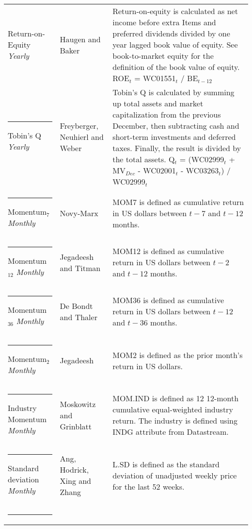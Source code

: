 \documentclass[12pt]{article}
\begin{document}
{{\begin{xltabular}{\textwidth}{ >{\raggedright\arraybackslash}p{0.23\textwidth} >{\raggedright\arraybackslash}p{0.2\textwidth} X}
Return-on-Equity \newline \emph{Yearly}		& Haugen and Baker \citeyearpar{HAUGEN1996}		& Return-on-equity is calculated as net income before extra Items and preferred dividends divided by one year lagged book value of equity. See book-to-market equity for the definition of the book value of equity. \newline ROE$_t$ = WC01551$_{t}$ / BE$_{t-12}$ \\ \rule{-1ex}{3ex}
Tobin's Q 	\newline \emph{Yearly}			& Freyberger, Neuhierl and Weber \citeyearpar{Freyberger2020} & Tobin's Q is calculated by summing up total assets and market capitalization from the previous December, then subtracting cash and short-term investments and deferred taxes. Finally, the result is divided by the total assets. \newline Q$_t$ = (WC02999$_{t}$ + MV$_{Dec}$ - WC02001$_{t}$ - WC03263$_{t}$) / WC02999$_{t}$ \\ \rule{-1ex}{3ex}
Momentum$_{7}$ \newline \emph{Monthly}	& Novy-Marx \citeyearpar{NOVYMARX2012}			& MOM7 is defined as cumulative return in US dollars between $t-7$ and $t-12$ months.\\ \rule{-1ex}{3ex}
Momentum$_{12}$ \newline \emph{Monthly}	& Jegadeesh and Titman \citeyearpar{Jegadeesh1993}	& MOM12 is defined as cumulative return in US dollars between $t-2$ and $t-12$ months.\\ \rule{-1ex}{3ex}
Momentum$_{36}$ \newline \emph{Monthly}	& De Bondt and Thaler \citeyearpar{DeBondt1985}		& MOM36 is defined as cumulative return in US dollars between $t-12$ and $t-36$ months.\\ \rule{-1ex}{3ex}
Momentum$_{2}$ \newline \emph{Monthly}	& Jegadeesh \citeyearpar{Jegadeesh1990}			& MOM2 is defined as the prior month's return in US dollars.\\ \rule{-1ex}{3ex}
Industry Momentum \newline \emph{Monthly} 	& Moskowitz and Grinblatt \citeyearpar{Moskowitz1999}	& MOM.IND is defined as 12 12-month cumulative equal-weighted industry return. The industry is defined using INDG attribute from Datastream. \\ \rule{-1ex}{3ex}
Standard deviation \newline \emph{Monthly}	& Ang, Hodrick, Xing and Zhang \citeyearpar{Ang2006}	& L.SD is defined as the standard deviation of unadjusted weekly price for the last 52 weeks. \\ \rule{-1ex}{3ex}

\end{xltabular}}}
\end{document}
